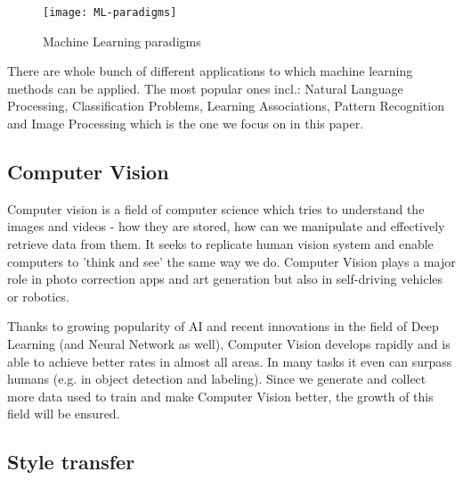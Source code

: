 \documentclass[../Main.tex]{subfiles}
\begin{document}
    \begin{figure}[h]
        \centering
        \texttt{[image: ML-paradigms]}
        \caption{Machine Learning paradigms}
        \label{fig:ML-paradigms}
    \end{figure}

\newpage
    There are whole bunch of different applications to which machine learning methods can be applied. The most popular ones incl.: Natural Language Processing, Classification Problems, Learning Associations, Pattern Recognition and Image Processing which is the one we focus on in this paper.

\subsection{Computer Vision}
    Computer vision is a field of computer science which tries to understand the images and videos - how they are stored, how can we manipulate and effectively retrieve data from them. It seeks to replicate human vision system and enable computers to 'think and see' the same way we do.  Computer Vision plays a major role in photo correction apps and art generation but also in self-driving vehicles or robotics.
    
    Thanks to growing popularity of AI and recent innovations in the field of Deep Learning (and Neural Network as well), Computer Vision develops rapidly and is able to achieve better rates in almost all areas. In many tasks it even can surpass humans (e.g. in object detection and labeling). Since we generate and collect more data used to train and make Computer Vision better, the growth of this field will be ensured.

\newpage
\subsection{Style transfer}
\end{document}
